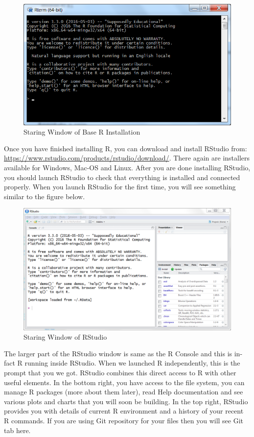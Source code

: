 \documentclass[]{krantz}
\begin{document}
\begin{figure}
\centering
\includegraphics{images/rbase.png}
\caption{Staring Window of Base R Installation}
\end{figure}

Once you have finished installing R, you can download and install
RStudio from: \url{https://www.rstudio.com/products/rstudio/download/}.
There again are installers available for Windows, Mac-OS and Linux.
After you are done installing RStudio, you should launch RStudio to
check that everything is installed and connected properly. When you
launch RStudio for the first time, you will see something similar to the
figure below.

\begin{figure}
\centering
\includegraphics{images/rstudio.png}
\caption{Staring Window of RStudio}
\end{figure}

The larger part of the RStudio window is same as the R Console and this
is in-fact R running inside RStudio. When we launched R independently,
this is the prompt that you we got. RStudio combines this direct access
to R with other useful elements. In the bottom right, you have access to
the file system, you can manage R packages (more about them later), read
Help documentation and see various plots and charts that you will soon
be building. In the top right, RStudio provides you with details of
current R environment and a history of your recent R commands. If you
are using Git repository for your files then you will see Git tab here.
\end{document}
